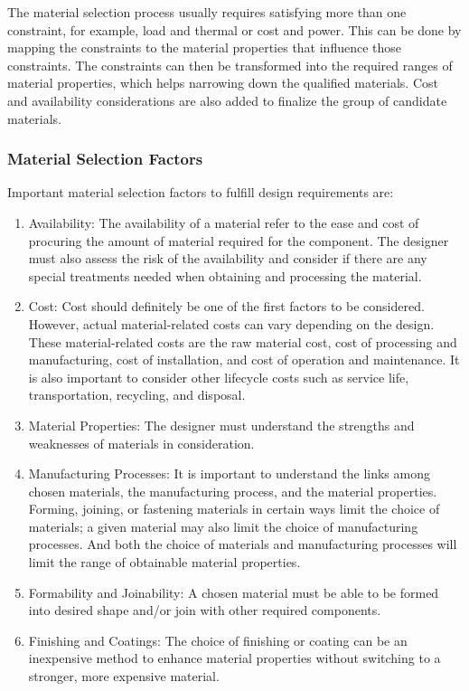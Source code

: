 \documentclass[a4paper,openany,nobib]{tufte-book}
\begin{document}
The material selection process usually requires satisfying more than one
constraint, for example, load and thermal or cost and power. This can be
done by mapping the constraints to the material properties that
influence those constraints. The constraints can then be transformed
into the required ranges of material properties, which helps narrowing
down the qualified materials. Cost and availability considerations are
also added to finalize the group of candidate materials.

\subsubsection{Material Selection Factors}
\label{material-selection-factors}
Important material selection factors to fulfill design requirements are:

\begin{enumerate}
\item Availability: The availability of a material refer to the ease and
cost of procuring the amount of material required for the component.
The designer must also assess the risk of the availability and
consider if there are any special treatments needed when obtaining
and processing the material.

\item Cost: Cost should definitely be one of the first factors to be
considered. However, actual material-related costs can vary depending
on the design. These material-related costs are the raw material
cost, cost of processing and manufacturing, cost of installation, and
cost of operation and maintenance. It is also important to consider
other lifecycle costs such as service life, transportation,
recycling, and disposal.

\item Material Properties: The designer must understand the strengths and
weaknesses of materials in consideration.

\item Manufacturing Processes: It is important to understand the links
among chosen materials, the manufacturing process, and the material
properties. Forming, joining, or fastening materials in certain ways
limit the choice of materials; a given material may also limit the
choice of manufacturing processes. And both the choice of materials
and manufacturing processes will limit the range of obtainable
material properties.

\item Formability and Joinability: A chosen material must be able to be
formed into desired shape and/or join with other required components.

\item Finishing and Coatings: The choice of finishing or coating can be an
inexpensive method to enhance material properties without switching
to a stronger, more expensive material.
\end{enumerate}
\end{document}
